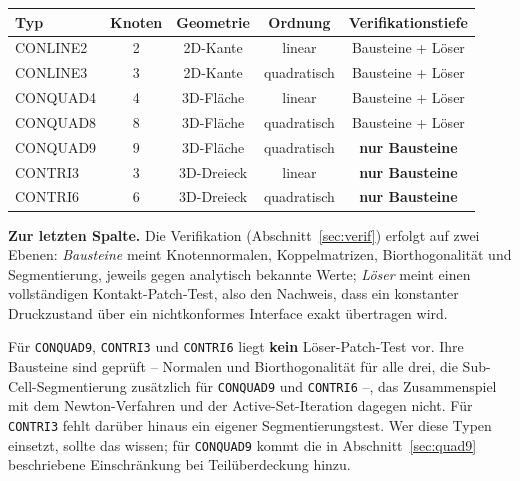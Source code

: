 \documentclass[a4paper,11pt]{article}
\newcommand{\code}[1]{\texttt{\small #1}}
\begin{document}
\begin{center}
\small
\begin{tabular}{lcccc}
\toprule
Typ & Knoten & Geometrie & Ordnung & Verifikationstiefe \\
\midrule
CONLINE2 & 2 & 2D-Kante   & linear       & Bausteine + Löser \\
CONLINE3 & 3 & 2D-Kante   & quadratisch  & Bausteine + Löser \\
CONQUAD4 & 4 & 3D-Fläche  & linear       & Bausteine + Löser \\
CONQUAD8 & 8 & 3D-Fläche  & quadratisch  & Bausteine + Löser \\
CONQUAD9 & 9 & 3D-Fläche  & quadratisch  & \textbf{nur Bausteine} \\
CONTRI3  & 3 & 3D-Dreieck & linear       & \textbf{nur Bausteine} \\
CONTRI6  & 6 & 3D-Dreieck & quadratisch  & \textbf{nur Bausteine} \\
\bottomrule
\end{tabular}
\end{center}

\noindent\textbf{Zur letzten Spalte.} Die Verifikation (Abschnitt~\ref{sec:verif}) erfolgt auf
zwei Ebenen: \emph{Bausteine} meint Knotennormalen, Koppelmatrizen, Biorthogonalität und
Segmentierung, jeweils gegen analytisch bekannte Werte; \emph{Löser} meint einen vollständigen
Kontakt-Patch-Test, also den Nachweis, dass ein konstanter Druckzustand über ein nichtkonformes
Interface exakt übertragen wird.

Für \code{CONQUAD9}, \code{CONTRI3} und \code{CONTRI6} liegt \textbf{kein} Löser-Patch-Test vor.
Ihre Bausteine sind geprüft -- Normalen und Biorthogonalität für alle drei, die
Sub-Cell-Segmentierung zusätzlich für \code{CONQUAD9} und \code{CONTRI6} --, das
Zusammenspiel mit dem Newton-Verfahren und der Active-Set-Iteration dagegen nicht. Für
\code{CONTRI3} fehlt darüber hinaus ein eigener Segmentierungstest. Wer diese Typen einsetzt,
sollte das wissen; für \code{CONQUAD9} kommt die in Abschnitt~\ref{sec:quad9} beschriebene
Einschränkung bei Teilüberdeckung hinzu.
\end{document}
